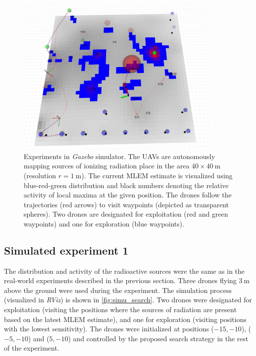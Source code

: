 \begin{figure}[!htb]
  \centering
    \includegraphics[width=0.9\textwidth]{./fig/photos/simu_search.png}
  \caption{Experiments in \textit{Gazebo} simulator. The \ac{UAV}s are autonomously mapping sources of ionizing radiation place in the area $40 \times 40\ \si{\meter}$ (resolution $r = \SI{1}{\meter}$). 
  The current \ac{MLEM} estimate is visualized using blue-red-green distribution and black numbers denoting the relative activity of local maxima at the given position. 
  The drones follow the trajectories (red arrows) to visit waypoints (depicted as transparent spheres). Two drones are designated for exploitation (red and green waypoints) and one for exploration (blue waypoints).}
  \label{fig:simu_search}
\end{figure}
\subsection{Simulated experiment 1}
The distribution and activity of the radioactive sources were the same as in the real-world experiments described in the previous section.
Three drones flying $\SI{3}{\meter}$ above the ground were used during the experiment.  
The simulation process (visualized in \textit{RViz}) is shown in \autoref{fig:simu_search}.
Two drones were designated for exploitation (visiting the positions where the sources of radiation are present based on the latest \ac{MLEM} estimate), and one for exploration (visiting positions with the lowest sensitivity). 
The drones were initialized at positions ($-15, -10$), ($-5, -10$) and ($5, -10$) and controlled by the proposed search strategy in the rest of the experiment.
